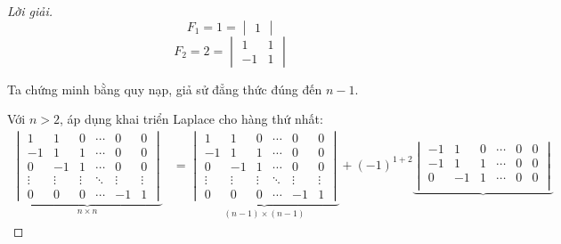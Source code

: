 \documentclass[class=linearalgebra,crop=false]{standalone}
\begin{document}
\begin{proof}[Lời giải]
    \[
        F_{1} = 1 = \begin{vmatrix}1\end{vmatrix}
    \]
    \[
        F_{2} = 2 = \begin{vmatrix}1 & 1 \\ -1 & 1 \end{vmatrix}
    \]
    \par Ta chứng minh bằng quy nạp, giả sử đẳng thức đúng đến $n-1$.
    \par Với $n > 2$, áp dụng khai triển Laplace cho hàng thứ nhất:
    \begingroup
    \allowdisplaybreaks
    \begin{align*}
        \underbrace{\begin{vmatrix}
                            1      & 1      & 0      & \cdots & 0      & 0      \\
                            -1     & 1      & 1      & \cdots & 0      & 0      \\
                            0      & -1     & 1      & \cdots & 0      & 0      \\
                            \vdots & \vdots & \vdots & \ddots & \vdots & \vdots \\
                            0      & 0      & 0      & \cdots & -1     & 1
                        \end{vmatrix}}_{n\times n}
         & =
        \underbrace{\begin{vmatrix}
                            1      & 1      & 0      & \cdots & 0      & 0      \\
                            -1     & 1      & 1      & \cdots & 0      & 0      \\
                            0      & -1     & 1      & \cdots & 0      & 0      \\
                            \vdots & \vdots & \vdots & \ddots & \vdots & \vdots \\
                            0      & 0      & 0      & \cdots & -1     & 1
                        \end{vmatrix}}_{(n-1)\times (n-1)}
        +
        (-1)^{1+2}
        \underbrace{\begin{vmatrix}
                            -1     & 1      & 0      & \cdots & 0      & 0      \\
                            -1     & 1      & 1      & \cdots & 0      & 0      \\
                            0      & -1     & 1      & \cdots & 0      & 0      \\

\end{vmatrix}}
\end{align*}
\end{proof}
\end{document}

